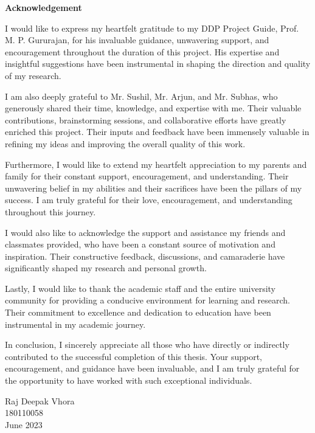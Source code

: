 \documentclass[12pt, a4paper]{report}
\begin{document}
\cleardoublepage
\thispagestyle{empty}
\addtocounter{page}{-1}%
\mbox{}

\newpage
\begin{center}
    \vspace{10mm}
    \Large \textbf{Acknowledgement}
\end{center}

I would like to express my heartfelt gratitude to my DDP Project Guide, Prof. M. P. Gururajan, for his invaluable guidance, unwavering support, and encouragement throughout the duration of this project. His expertise and insightful suggestions have been instrumental in shaping the direction and quality of my research.

I am also deeply grateful to Mr. Sushil, Mr. Arjun, and Mr. Subhas, who generously shared their time, knowledge, and expertise with me. Their valuable contributions, brainstorming sessions, and collaborative efforts have greatly enriched this project. Their inputs and feedback have been immensely valuable in refining my ideas and improving the overall quality of this work.

Furthermore, I would like to extend my heartfelt appreciation to my parents and family for their constant support, encouragement, and understanding. Their unwavering belief in my abilities and their sacrifices have been the pillars of my success. I am truly grateful for their love, encouragement, and understanding throughout this journey.

I would also like to acknowledge the support and assistance my friends and classmates provided, who have been a constant source of motivation and inspiration. Their constructive feedback, discussions, and camaraderie have significantly shaped my research and personal growth.

Lastly, I would like to thank the academic staff and the entire university community for providing a conducive environment for learning and research. Their commitment to excellence and dedication to education have been instrumental in my academic journey.

In conclusion, I sincerely appreciate all those who have directly or indirectly contributed to the successful completion of this thesis. Your support, encouragement, and guidance have been invaluable, and I am truly grateful for the opportunity to have worked with such exceptional individuals.


\vspace{1cm}
\begin{FlushRight}
    Raj Deepak Vhora\\ 180110058\\ June 2023
\end{FlushRight}
\end{document}
